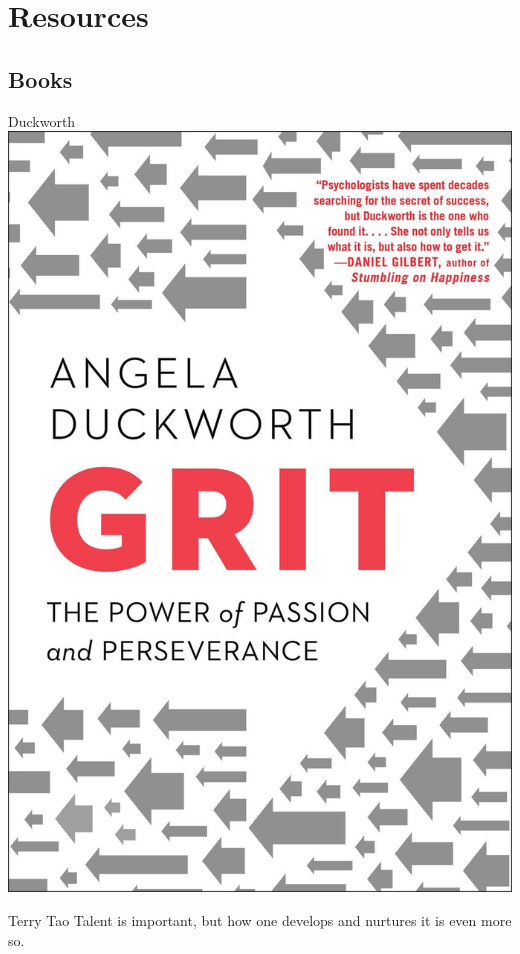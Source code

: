 \chapter{Resources}
\section{Books}
\begin{boxResource}[lefthand width=5cm, sidebyside]{Duckworth}
\includegraphics[width=\textwidth]{./img/Duckworth_Grit}
\tcblower
\begin{boxQuote}{Terry Tao}
Talent is important, but how one develops and nurtures it is even more so.
\end{boxQuote}
\end{boxResource}
%
